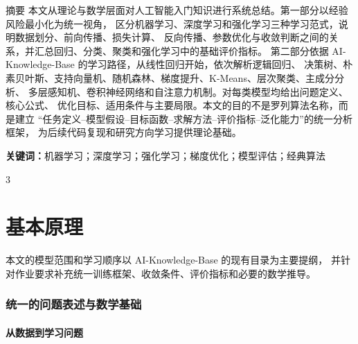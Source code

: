 \documentclass[UTF8,zihao=-4,a4paper,fontset=windows]{ctexart}
\begin{document}
\begin{definitionbox}{摘要}
本文从理论与数学层面对人工智能入门知识进行系统总结。第一部分以经验风险最小化为统一视角，
区分机器学习、深度学习和强化学习三种学习范式，说明数据划分、前向传播、损失计算、
反向传播、参数优化与收敛判断之间的关系，并汇总回归、分类、聚类和强化学习中的基础评价指标。
第二部分依据 AI-Knowledge-Base 的学习路径，从线性回归开始，依次解析逻辑回归、
决策树、朴素贝叶斯、支持向量机、随机森林、梯度提升、K-Means、层次聚类、主成分分析、
多层感知机、卷积神经网络和自注意力机制。对每类模型均给出问题定义、核心公式、
优化目标、适用条件与主要局限。本文的目的不是罗列算法名称，而是建立
“任务定义--模型假设--目标函数--求解方法--评价指标--泛化能力”的统一分析框架，
为后续代码复现和研究方向学习提供理论基础。

\textbf{关键词：}机器学习；深度学习；强化学习；梯度优化；模型评估；经典算法
\end{definitionbox}

\vspace{0.45em}
\begin{multicols}{3}
  \scriptsize
  \tableofcontents
\end{multicols}
\clearpage
{}

\part{基本原理}

\noindent
本文的模型范围和学习顺序以 AI-Knowledge-Base 的现有目录为主要提纲，
并针对作业要求补充统一训练框架、收敛条件、评价指标和必要的数学推导\cite{aikb}。

\section{统一的问题表述与数学基础}

\subsection{从数据到学习问题}
\end{document}
